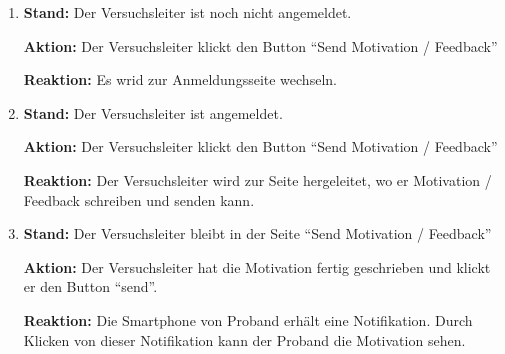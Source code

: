 \documentclass[a4paper]{scrreprt}
\begin{document}
\begin{itemize}
                    \begin{enumerate}
                        \item \par \textbf{Stand: } Der Versuchsleiter ist noch nicht angemeldet.
                              \par \textbf{Aktion: } Der Versuchsleiter klickt den Button ``Send Motivation / Feedback''
                              \par \textbf{Reaktion: } Es wrid zur Anmeldungsseite wechseln.
                        \item \par \textbf{Stand: } Der Versuchsleiter ist angemeldet.
                              \par \textbf{Aktion: }  Der Versuchsleiter klickt den Button ``Send Motivation / Feedback''
                              \par \textbf{Reaktion: } Der Versuchsleiter wird zur Seite hergeleitet, wo er Motivation / Feedback schreiben und senden kann.
                        \item \par \textbf{Stand: } Der Versuchsleiter bleibt in der Seite ``Send Motivation / Feedback''
                              \par \textbf{Aktion: } Der Versuchsleiter hat die Motivation fertig geschrieben und klickt er den Button ``send''.
                              \par \textbf{Reaktion: } Die Smartphone von Proband erh\"alt eine Notifikation. Durch Klicken von dieser Notifikation kann der Proband die Motivation sehen.
                    \end{enumerate}




\end{itemize}
\end{document}
